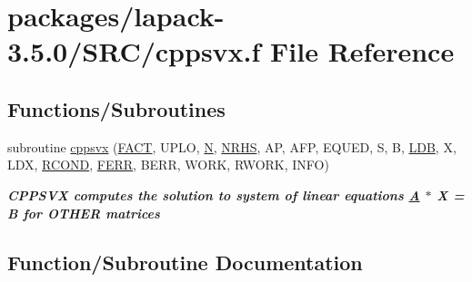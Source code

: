 \hypertarget{cppsvx_8f}{}\section{packages/lapack-\/3.5.0/\+S\+R\+C/cppsvx.f File Reference}
\label{cppsvx_8f}
\subsection*{Functions/\+Subroutines}
\begin{DoxyCompactItemize}
\item 
subroutine \hyperlink{cppsvx_8f_a05828086b02ef88bdee1ed58fe839573}{cppsvx} (\hyperlink{superlu__enum__consts_8h_af00a42ecad444bbda75cde1b64bd7e72a1b6692b56d378abb85bd49063721d034}{F\+A\+C\+T}, U\+P\+L\+O, \hyperlink{polmisc_8c_a0240ac851181b84ac374872dc5434ee4}{N}, \hyperlink{example__user_8c_aa0138da002ce2a90360df2f521eb3198}{N\+R\+H\+S}, A\+P, A\+F\+P, E\+Q\+U\+E\+D, S, B, \hyperlink{example__user_8c_a50e90a7104df172b5a89a06c47fcca04}{L\+D\+B}, X, L\+D\+X, \hyperlink{superlu__enum__consts_8h_af00a42ecad444bbda75cde1b64bd7e72a9b5c151728d8512307565994c89919d5}{R\+C\+O\+N\+D}, \hyperlink{superlu__enum__consts_8h_af00a42ecad444bbda75cde1b64bd7e72a78fd14d7abebae04095cfbe02928f153}{F\+E\+R\+R}, B\+E\+R\+R, W\+O\+R\+K, R\+W\+O\+R\+K, I\+N\+F\+O)
\begin{DoxyCompactList}\small\item\em {\bfseries  C\+P\+P\+S\+V\+X computes the solution to system of linear equations \hyperlink{classA}{A} $\ast$ X = B for O\+T\+H\+E\+R matrices} \end{DoxyCompactList}\end{DoxyCompactItemize}


\subsection{Function/\+Subroutine Documentation}
\hypertarget{cppsvx_8f_a05828086b02ef88bdee1ed58fe839573}{}
